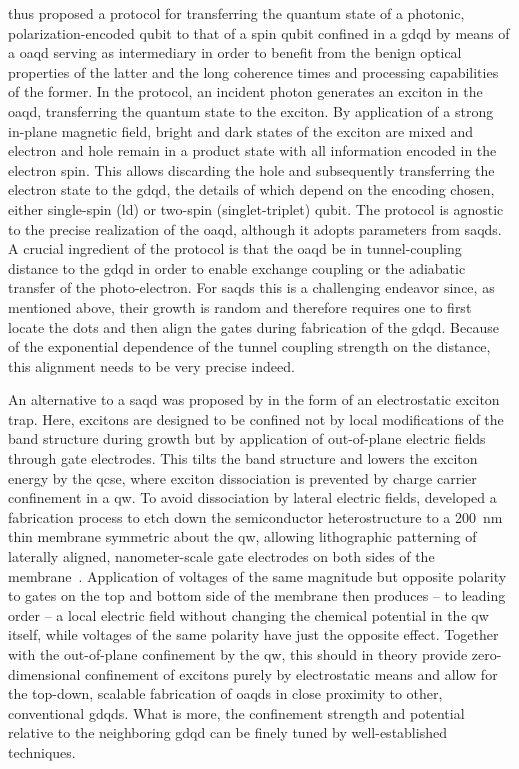\textcite{Jocker2019} thus proposed a protocol for transferring the quantum state of a photonic, polarization-encoded qubit to that of a spin qubit confined in a \gls{gdqd} by means of a \gls{oaqd} serving as intermediary in order to benefit from the benign optical properties of the latter and the long coherence times and processing capabilities of the former.
In the protocol, an incident photon generates an exciton in the \gls{oaqd}, transferring the quantum state to the exciton.
By application of a strong in-plane magnetic field, bright and dark states of the exciton are mixed and electron and hole remain in a product state with all information encoded in the electron spin.
This allows discarding the hole and subsequently transferring the electron state to the \gls{gdqd}, the details of which depend on the encoding chosen, either single-spin (\gls{ld}) or two-spin (singlet-triplet) qubit.
The protocol is agnostic to the precise realization of the \gls{oaqd}, although it adopts parameters from \glspl{saqd}.
A crucial ingredient of the protocol is that the \gls{oaqd} be in tunnel-coupling distance to the \gls{gdqd} in order to enable exchange coupling or the adiabatic transfer of the photo-electron.
For \glspl{saqd} this is a challenging endeavor since, as mentioned above, their growth is random and therefore requires one to first locate the dots and then align the gates during fabrication of the \gls{gdqd}.
Because of the exponential dependence of the tunnel coupling strength on the distance, this alignment needs to be very precise indeed.

An alternative to a \gls{saqd} was proposed by \textcite{Descamps2021} in the form of an electrostatic exciton trap.
Here, excitons are designed to be confined not by local modifications of the band structure during growth but by application of out-of-plane electric fields through gate electrodes.
This tilts the band structure and lowers the exciton energy by the \gls{qcse}, where exciton dissociation is prevented by charge carrier confinement in a \gls{qw}.
To avoid dissociation by lateral electric fields, \textcite{Descamps2021} developed a fabrication process to etch down the semiconductor heterostructure to a \qty{200}{\nano\meter} thin membrane symmetric about the \gls{qw}, allowing lithographic patterning of laterally aligned, nanometer-scale gate electrodes on both sides of the membrane~\cite{Descamps2023}.
Application of voltages of the same magnitude but opposite polarity to gates on the top and bottom side of the membrane then produces -- to leading order -- a local electric field without changing the chemical potential in the \gls{qw} itself, while voltages of the same polarity have just the opposite effect.
Together with the out-of-plane confinement by the \gls{qw}, this should in theory provide zero-dimensional confinement of excitons purely by electrostatic means and allow for the top-down, scalable fabrication of \glspl{oaqd} in close proximity to other, conventional \glspl{gdqd}.
What is more, the confinement strength and potential relative to the neighboring \gls{gdqd} can be finely tuned by well-established techniques.

